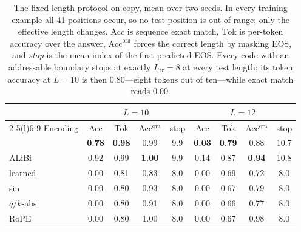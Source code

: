 \begin{table}[t]
\centering
\caption{The fixed-length protocol on copy, mean over two seeds. In every training
example all 41 positions occur, so no test position is out of range; only the
effective length changes. $\mathrm{Acc}$ is sequence exact match, $\mathrm{Tok}$ is
per-token accuracy over the answer, $\mathrm{Acc}^{\mathrm{ora}}$ forces the correct
length by masking EOS, and \emph{stop} is the mean index of the first predicted EOS.
Every code with an addressable boundary stops at exactly $L_{\mathrm{tr}}{=}8$ at
every test length; its token accuracy at $L{=}10$ is then $0.80$---eight tokens out
of ten---while exact match reads $0.00$.}
\label{tab:padded}
\small
\begin{tabular}{@{}lcccccccc@{}}
\toprule
& \multicolumn{4}{c}{$L=10$} & \multicolumn{4}{c}{$L=12$} \\
\cmidrule(lr){2-5}\cmidrule(l){6-9}
Encoding & Acc & Tok & Acc$^{\mathrm{ora}}$ & stop
         & Acc & Tok & Acc$^{\mathrm{ora}}$ & stop \\
\midrule
\nope{}  & \textbf{0.78} & \textbf{0.98} & 0.99 & 9.9
         & \textbf{0.03} & \textbf{0.79} & 0.88 & 10.7 \\
ALiBi    & 0.92 & 0.99 & \textbf{1.00} & 9.9
         & 0.14 & 0.87 & \textbf{0.94} & 10.8 \\
learned  & 0.00 & 0.81 & 0.83 & 8.0
         & 0.00 & 0.69 & 0.72 & 8.0 \\
sin      & 0.00 & 0.80 & 0.93 & 8.0
         & 0.00 & 0.67 & 0.79 & 8.0 \\
$q/k$-abs & 0.00 & 0.80 & 0.91 & 8.0
         & 0.00 & 0.66 & 0.77 & 8.0 \\
RoPE     & 0.00 & 0.80 & 1.00 & 8.0
         & 0.00 & 0.67 & 0.98 & 8.0 \\
\bottomrule
\end{tabular}
\end{table}
